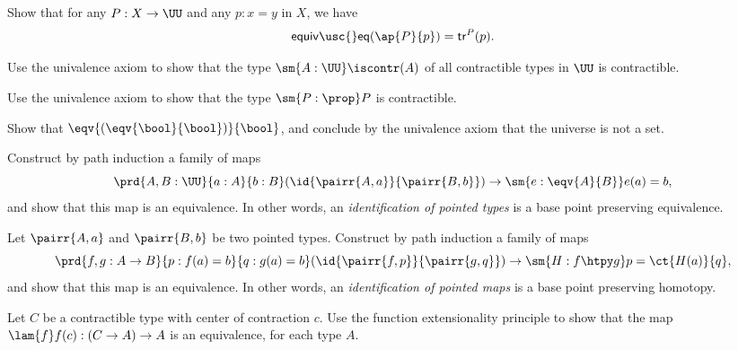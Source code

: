 \begin{exercises}
\item \label{ex:tr_ap} Show that for any $P:X\to \UU$ and any $p:x=y$ in $X$, we have
\begin{equation*}
\mathsf{equiv\usc{}eq}(\ap{P}{p})=\mathsf{tr}^P(p).
\end{equation*}
\item Use the univalence axiom to show that the type $\sm{A:\UU}\iscontr(A)$ of all contractible types in $\UU$ is contractible.
\item Use the univalence axiom to show that the type $\sm{P:\prop}P$ is contractible.
\item Show that $\eqv{(\eqv{\bool}{\bool})}{\bool}$, and conclude by the univalence axiom that the universe is not a set.
\item Construct by path induction a family of maps
\begin{equation*}
\prd{A,B:\UU}{a:A}{b:B} (\id{\pairr{A,a}}{\pairr{B,b}})\to \sm{e:\eqv{A}{B}}e(a)=b,
\end{equation*}
and show that this map is an equivalence. In other words, an \emph{identification of pointed types} is a base point preserving equivalence.
\item Let $\pairr{A,a}$ and $\pairr{B,b}$ be two pointed types. Construct by path induction a family of maps
\begin{equation*}
\prd{f,g:A\to B}{p:f(a)=b}{q:g(a)=b} (\id{\pairr{f,p}}{\pairr{g,q}})\to \sm{H:f\htpy g} p = \ct{H(a)}{q},
\end{equation*}
and show that this map is an equivalence. In other words, an \emph{identification of pointed maps} is a base point preserving homotopy.
\item Let $C$ be a contractible type with center of contraction $c$. Use the function extensionality principle to show that the map $\lam{f}f(c):(C\to A)\to A$ is an equivalence, for each type $A$.
\end{exercises}
